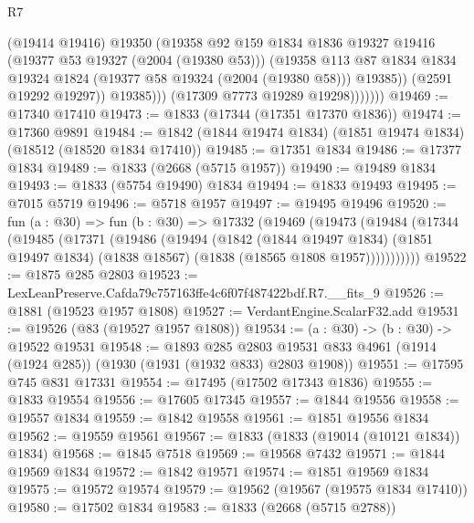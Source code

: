 \begin{lexlean}{R7}
\begin{coremodule}
                        (@19414 @19416)
                        @19350
                        (@19358
                          @92
                          @159
                          @1834
                          @1836
                          @19327
                          @19416
                          (@19377 @53 @19327 (@2004 (@19380 @53)))
                          (@19358
                            @113
                            @87
                            @1834
                            @1834
                            @19324
                            @1824
                            (@19377 @58 @19324 (@2004 (@19380 @58)))
                            @19385))
                        (@2591 @19292 @19297))
                      @19385)))
                (@17309 @7773 @19289 @19298)))))))
@19469 := @17340 @17410
@19473 := @1833 (@17344 (@17351 @17370 @1836))
@19474 := @17360 @9891
@19484 := @1842 (@1844 @19474 @1834) (@1851 @19474 @1834) (@18512 (@18520 @1834 @17410))
@19485 := @17351 @1834
@19486 := @17377 @1834
@19489 := @1833 (@2668 (@5715 @1957))
@19490 := @19489 @1834
@19493 := @1833 (@5754 @19490) @1834
@19494 := @1833 @19493
@19495 := @7015 @5719
@19496 := @5718 @1957
@19497 := @19495 @19496
@19520 := fun (a : @30) =>
  fun (b : @30) =>
  @17332
    (@19469
      (@19473
        (@19484
          (@17344
            (@19485
              (@17371
                (@19486
                  (@19494
                    (@1842
                      (@1844 @19497 @1834)
                      (@1851 @19497 @1834)
                      (@1838 @18567)
                      (@1838 (@18565 @1808 @1957)))))))))))
@19522 := @1875 @285 @2803
@19523 := LexLeanPreserve.Cafda79c757163ffe4c6f07f487422bdf.R7.__fits_9
@19526 := @1881 (@19523 @1957 @1808)
@19527 := VerdantEngine.ScalarF32.add
@19531 := @19526 (@83 (@19527 @1957 @1808))
@19534 := (a : @30) -> (b : @30) -> @19522 @19531
@19548 := @1893
    @285
    @2803
    @19531
    @833
    @4961
    (@1914 (@1924 @285))
    (@1930 (@1931 (@1932 @833) @2803 @1908))
@19551 := @17595 @745 @831 @17331
@19554 := @17495 (@17502 @17343 @1836)
@19555 := @1833 @19554
@19556 := @17605 @17345
@19557 := @1844 @19556
@19558 := @19557 @1834
@19559 := @1842 @19558
@19561 := @1851 @19556 @1834
@19562 := @19559 @19561
@19567 := @1833 (@1833 (@19014 (@10121 @1834)) @1834)
@19568 := @1845 @7518
@19569 := @19568 @7432
@19571 := @1844 @19569 @1834
@19572 := @1842 @19571
@19574 := @1851 @19569 @1834
@19575 := @19572 @19574
@19579 := @19562 (@19567 (@19575 @1834 @17410))
@19580 := @17502 @1834
@19583 := @1833 (@2668 (@5715 @2788))

\end{coremodule}
\end{lexlean}
